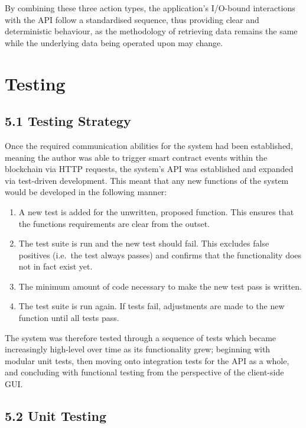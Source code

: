 \documentclass[12pt]{report}
\providecommand{\tightlist}{%
  \setlength{\itemsep}{0pt}\setlength{\parskip}{0pt}}
\begin{document}
By combining these three action types, the application's I/O-bound
interactions with the API follow a standardised sequence, thus providing
clear and deterministic behaviour, as the methodology of retrieving data
remains the same while the underlying data being operated upon may
change.

\chapter{Testing}

\section{5.1 Testing Strategy}\label{testing-strategy}

Once the required communication abilities for the system had been
established, meaning the author was able to trigger smart contract
events within the blockchain via HTTP requests, the system's API was
established and expanded via test-driven development. This meant that
any new functions of the system would be developed in the following
manner\cite{beck2003test}:

\begin{enumerate}
\def\labelenumi{\arabic{enumi}.}
\tightlist
\item
  A new test is added for the unwritten, proposed function. This ensures
  that the functions requirements are clear from the outset.
\item
  The test suite is run and the new test should fail. This excludes
  false positives (i.e.~the test always passes) and confirms that the
  functionality does not in fact exist yet.
\item
  The minimum amount of code necessary to make the new test pass is
  written.
\item
  The test suite is run again. If tests fail, adjustments are made to
  the new function until all tests pass.
\end{enumerate}

The system was therefore tested through a sequence of tests which became
increasingly high-level over time as its functionality grew; beginning
with modular unit tests, then moving onto integration tests for the API
as a whole, and concluding with functional testing from the perspective
of the client-side GUI.

\section{5.2 Unit Testing}\label{unit-testing}
\end{document}
